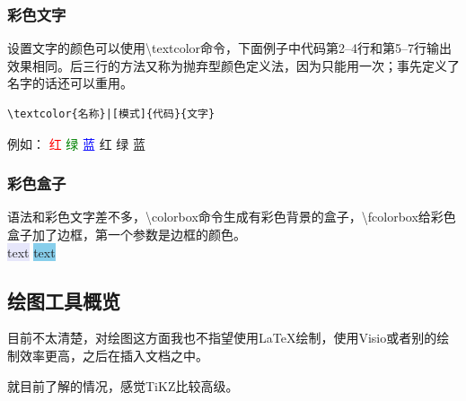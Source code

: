 \documentclass[UTF8]{article}
\begin{document}
\subsubsection{彩色文字}
设置文字的颜色可以使用\textbackslash textcolor命令，下面例子中代码第2–4行和第5–7行输出效果相同。后三行的方法又称为抛弃型颜色定义法，因为只能用一次；事先定义了名字的话还可以重用。
\begin{lstlisting}
\textcolor{名称}|[模式]{代码}{文字}	
\end{lstlisting}
例如：
\textcolor{red}{红}
\textcolor{green}{绿}
\textcolor{blue}{蓝}
\textcolor[RGB]{255,0,0}{红}
\textcolor[HTML]{00FF00}{绿}
\textcolor[rgb]{0,0,1}{蓝}

\subsubsection{彩色盒子}
语法和彩色文字差不多，\textbackslash colorbox命令生成有彩色背景的盒子，\textbackslash fcolorbox给彩色盒子加了边框，第一个参数是边框的颜色。\\
\colorbox{Lavender}{text}
\colorbox{SkyBlue}{text}

\subsection{绘图工具概览}
目前不太清楚，对绘图这方面我也不指望使用\LaTeX 绘制，使用Visio或者别的绘制效率更高，之后在插入文档之中。

就目前了解的情况，感觉TiKZ比较高级。
\end{document}
